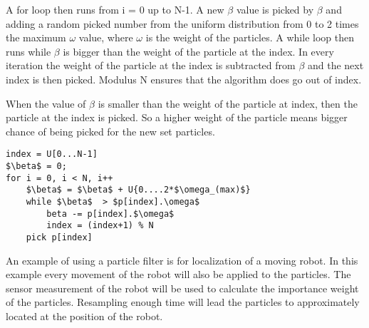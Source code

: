 A for loop then runs from i = 0 up to N-1. A new $\beta$ value is picked by $\beta$ and adding a random picked number from the uniform distribution from 0 to 2 times the maximum $\omega$ value, where $\omega$ is the weight of the particles. A while loop then runs while $\beta$ is bigger than the weight of the particle at the index. In every iteration the weight of the particle at the index is subtracted from $\beta$ and the next index is then picked. Modulus N ensures that the algorithm does go out of index. 

When the value of $\beta$ is smaller than the weight of the particle at index, then the particle at the index is picked. So a higher weight of the particle means bigger chance of being picked for the new set particles. 

\begin{lstlisting}[caption={Pesudo code for the resampling wheel}, label=lst:wheel, mathescape=true]
index = U[0...N-1]
$\beta$ = 0;
for i = 0, i < N, i++
	$\beta$ = $\beta$ + U{0....2*$\omega_(max)$}
	while $\beta$  > $p[index].\omega$ 
		beta -= p[index].$\omega$
		index = (index+1) % N
	pick p[index]
\end{lstlisting}

An example of using a particle filter is for localization of a moving robot. In this example every movement of the robot will also be applied to the particles. The sensor measurement of the robot will be used to calculate the importance weight of the particles. Resampling enough time will lead the particles to approximately located at the position of the robot.



